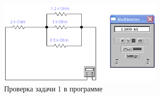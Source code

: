 \begin{figure}[h!]
  \begin{center}
    \includegraphics[width=0.7\textwidth]{authors/stepanuk-2-fig-2.png}
  \end{center}
  \caption{Проверка задачи 1 в программе}
  \label{fig:stepanuk-2-fig-2}
\end{figure}
